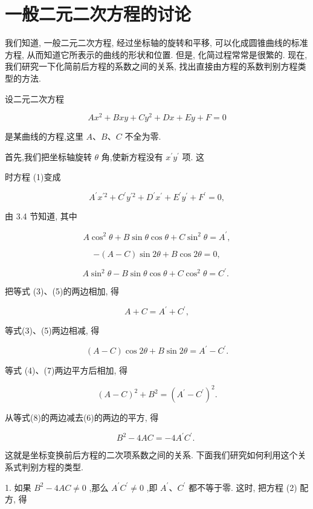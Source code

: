 \documentclass[lang=cn,newtx,10pt,scheme=chinese]{elegantbook}
\begin{document}
\section{一般二元二次方程的讨论}

我们知道, 一般二元二次方程, 经过坐标轴的旋转和平移, 可以化成圆锥曲线的标准方程, 从而知道它所表示的曲线的形状和位置. 但是, 化简过程常常是很繁的. 现在, 我们研究一下化简前后方程的系数之间的关系, 找出直接由方程的系数判别方程类型的方法.

设二元二次方程

\[
  A{x}^{2} + {Bxy} + C{y}^{2} + {Dx} + {Ey} + F = 0 \tag{1}
\]

是某曲线的方程,这里 \(A\text{、}B\text{、}C\) 不全为零.

首先,我们把坐标轴旋转 \(\theta\) 角,使新方程没有 \({x}^{\prime }{y}^{\prime }\) 项. 这

时方程 (1)变成

\[
    {A}^{\prime }{x}^{\prime 2} + {C}^{\prime }{y}^{\prime 2} + {D}^{\prime }{x}^{\prime } + {E}^{\prime }{y}^{\prime } + {F}^{\prime } = 0, \tag{2}
\]

由 3.4 节知道, 其中

\[
  A{\cos }^{2}\theta + B\sin \theta \cos \theta + C{\sin }^{2}\theta = {A}^{\prime }, \tag{3}
\]

\[
  - \left( {A - C}\right) \sin {2\theta } + B\cos {2\theta } = 0, \tag{4}
\]

\[
  A{\sin }^{2}\theta - B\sin \theta \cos \theta + C{\cos }^{2}\theta = {C}^{\prime }\text{. } \tag{5}
\]

把等式 (3)、(5)的两边相加, 得

\[
  A + C = {A}^{\prime } + {C}^{\prime }, \tag{6}
\]

等式(3)、(5)两边相减, 得

\[
  \left( {A - C}\right) \cos {2\theta } + B\sin {2\theta } = {A}^{\prime } - {C}^{\prime }\text{.} \tag{7}
\]

等式 (4)、(7)两边平方后相加, 得

\[
    {\left( A - C\right) }^{2} + {B}^{2} = {\left( {A}^{\prime } - {C}^{\prime }\right) }^{2}. \tag{8}
\]

从等式(8)的两边减去(6)的两边的平方, 得

\[
    {B}^{2} - {4AC} = - 4{A}^{\prime }{C}^{\prime }\text{. }
\]

这就是坐标变换前后方程的二次项系数之间的关系. 下面我们研究如何利用这个关系式判别方程的类型.

1. 如果 \({B}^{2} - {4AC} \neq 0\) ,那么 \({A}^{\prime }{C}^{\prime } \neq 0\) ,即 \({A}^{\prime }\text{、}{C}^{\prime }\) 都不等于零. 这时, 把方程 (2) 配方, 得
\end{document}

